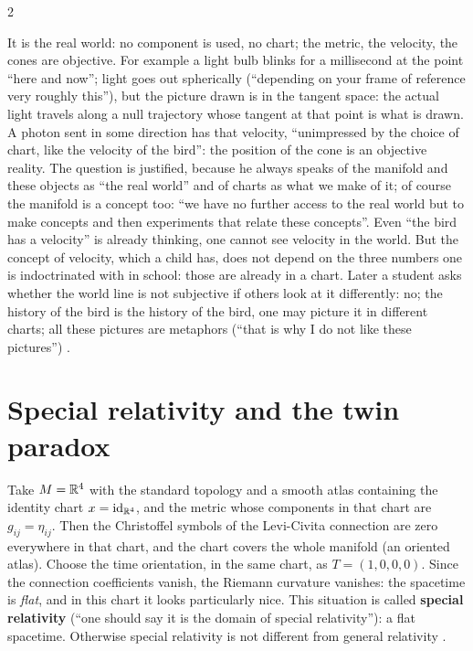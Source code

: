 \begin{paracol}{2}
\begin{coursenote}
It is the real world: no component is used, no chart; the metric, the velocity, the cones are objective. For example a light bulb blinks for a millisecond at the point ``here and now''; light goes out spherically (``depending on your frame of reference very roughly this''), but the picture drawn is in the tangent space: the actual light travels along a null trajectory whose tangent at that point is what is drawn. A photon sent in some direction has that velocity, ``unimpressed by the choice of chart, like the velocity of the bird'': the position of the cone is an objective reality. The question is justified, because he always speaks of the manifold and these objects as ``the real world'' and of charts as what we make of it; of course the manifold is a concept too: ``we have no further access to the real world but to make concepts and then experiments that relate these concepts''. Even ``the bird has a velocity'' is already thinking, one cannot see velocity in the world. But the concept of velocity, which a child has, does not depend on the three numbers one is indoctrinated with in school: those are already in a chart. Later a student asks whether the world line is not subjective if others look at it differently: no; the history of the bird is the history of the bird, one may picture it in different charts; all these pictures are metaphors (``that is why I do not like these pictures'') .
\end{coursenote}

\section{Special relativity and the twin paradox}\label{sec:c13-sr}

\begin{example}\label{ex:c13-sr}
Take $M=\mathbb{R}^4$ with the standard topology and a smooth atlas containing the identity chart $x=\mathrm{id}_{\mathbb{R}^4}$, and the metric whose components in that chart are $g_{ij}=\eta_{ij}$. Then the Christoffel symbols of the Levi-Civita connection are zero everywhere in that chart, and the chart covers the whole manifold (an oriented atlas). Choose the time orientation, in the same chart, as $T=(1,0,0,0)$. Since the connection coefficients vanish, the Riemann curvature vanishes: the spacetime is \emph{flat}, and in this chart it looks particularly nice. This situation is called \textbf{special relativity} (``one should say it is the domain of special relativity''): a flat spacetime. Otherwise special relativity is not different from general relativity .
\end{example}


\end{paracol}

